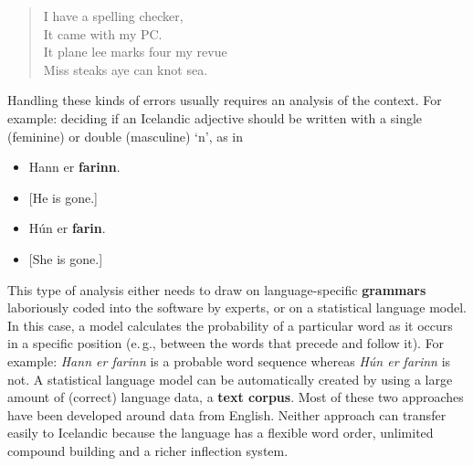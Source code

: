 \begin{multicols}{2}
\begin{quote}
  I have a spelling checker,\\
  It came with my PC.\\
  It plane lee marks four my revue\\
  Miss steaks aye can knot sea.
\end{quote}

Handling these kinds of errors usually requires an analysis of the context. For example: deciding if an Icelandic adjective should be written with a single (feminine) or double (masculine) ‘n’, as in

\begin{itemize}
\item Hann er \textbf{farinn}.
\item {[}He is gone.{]} 
\item Hún er \textbf{farin}.
\item {[}She is gone.{]}
\end{itemize}

This type of analysis either needs to draw on language-specific \textbf{grammars} laboriously coded into the software by experts, or on a statistical language model. In this case, a model calculates the probability of a particular word as it occurs in a specific position (e.\,g., between the words that precede and follow it). For example: \textit{Hann er farinn} is a probable word sequence whereas \textit{Hún er farinn} is not. A statistical language model can be automatically created by using a large amount of (correct) language data, a \textbf{text corpus}. Most of these two approaches have been developed around data from English. Neither approach can transfer easily to Icelandic because the language has a flexible word order, unlimited compound building and a richer inflection system.



\end{multicols}
